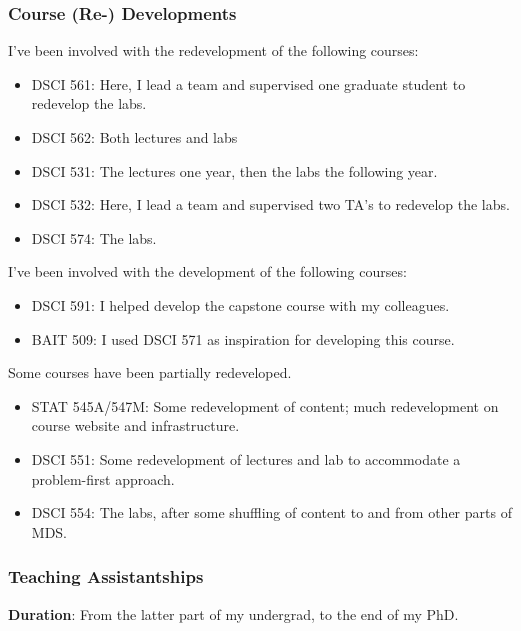 \documentclass[]{article}
\providecommand{\tightlist}{%
  \setlength{\itemsep}{0pt}\setlength{\parskip}{0pt}}
\begin{document}
\hypertarget{course-re--developments}{%
\subsubsection{Course (Re-) Developments}\label{course-re--developments}}

I've been involved with the redevelopment of the following courses:

\begin{itemize}
\tightlist
\item
  DSCI 561: Here, I lead a team and supervised one graduate student to redevelop the labs.
\item
  DSCI 562: Both lectures and labs
\item
  DSCI 531: The lectures one year, then the labs the following year.
\item
  DSCI 532: Here, I lead a team and supervised two TA's to redevelop the labs.
\item
  DSCI 574: The labs.
\end{itemize}

I've been involved with the development of the following courses:

\begin{itemize}
\tightlist
\item
  DSCI 591: I helped develop the capstone course with my colleagues.
\item
  BAIT 509: I used DSCI 571 as inspiration for developing this course.
\end{itemize}

Some courses have been partially redeveloped.

\begin{itemize}
\tightlist
\item
  STAT 545A/547M: Some redevelopment of content; much redevelopment on course website and infrastructure.
\item
  DSCI 551: Some redevelopment of lectures and lab to accommodate a problem-first approach.
\item
  DSCI 554: The labs, after some shuffling of content to and from other parts of MDS.
\end{itemize}

\hypertarget{teaching-assistantships}{%
\subsubsection{Teaching Assistantships}\label{teaching-assistantships}}

\textbf{Duration}: From the latter part of my undergrad, to the end of my PhD.
\end{document}
